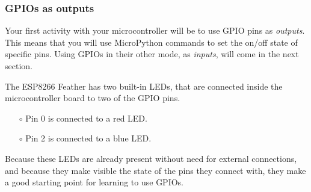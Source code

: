 \subsubsection{GPIOs as outputs}
Your first activity with your microcontroller will be to use GPIO pins as \emph{outputs}.
This means that you will use MicroPython commands to set the on/off state of specific pins.
Using GPIOs in their other mode, as \emph{inputs}, will come in the next section.

The ESP8266 Feather has two built-in LEDs, that are connected inside the microcontroller board to two of the GPIO pins.
\begin{itemize}
	\item[$\circ$] Pin 0 is connected to a red LED.
	\item[$\circ$] Pin 2 is connected to a blue LED.
\end{itemize}
Because these LEDs are already present without need for external connections, and because they make visible the state of the pins they connect with, they make a good starting point for learning to use GPIOs.

